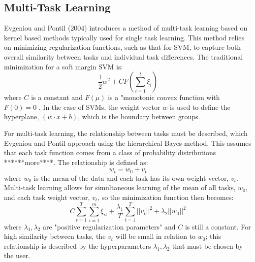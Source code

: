 \documentclass{llncs}
\begin{document}
\subsection{Multi-Task Learning}
Evgeniou and Pontil (2004) introduces a method of multi-task learning based on kernel based methods typically used for single task learning.  This method relies on minimizing regularization functions, such as that for SVM, to capture both overall similarity between tasks and individual task differences.  The traditional minimization for a soft margin SVM is:\\
\begin{equation}
\label{eq:svm}
\frac{1}{2}w^2 + C F(\sum_{i=1}^t \xi_i)
\end{equation}
where $C$ is a constant and $F(\mu)$ is a "monotonic convex function with $F(0)=0$ \cite{svm}. In the case of SVMs, the weight vector $w$ is used to define the hyperplane, $(w \cdot x +b)$,  which is the boundary between groups. 

For multi-task learning, the relationship between tasks must be described, which Evgeniou and Pontil approach using the hierarchical Bayes method. This assumes that each task function comes from a class of probability distributions ******more****.  The relationship is defined as:\\
\begin{equation}
\label{eq:sim}
 w_t = w_0 + v_t
\end{equation}
where $w_0$ is the mean of the data and each task has its own weight vector, $v_t$. Multi-task learning allows for simultaneous learning of the mean of all tasks, $w_0$, and each task weight vector, $v_t$, so the minimization function then becomes:\\
\begin{equation}
\label{eq:mtlsvm}
 C \sum_{t=1}^T \sum_{i=1}^m \xi_{it} + \frac{\lambda_1}{T} \sum_{t=1}^T ||v_t||^2 + \lambda_2||w_0||^2
\end{equation}
where $\lambda_1, \lambda_2$ are "positive regularization parameters" and $C$ is still a constant.  For high similarity between tasks, the $v_t$ will be small in relation to $w_0$; this relationship is described by the hyperparameters $\lambda_1, \lambda_2$ that must be chosen by the user.
\end{document}

